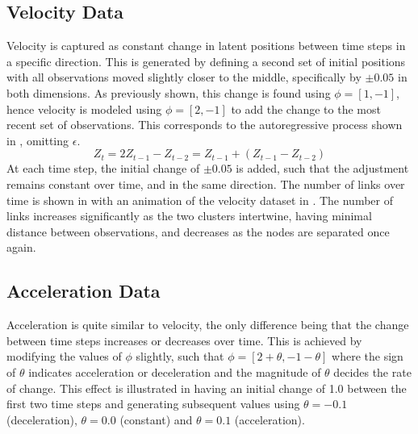     \subsection{Velocity Data}
        
        Velocity is captured as constant change in latent positions between time steps in a specific direction. This is generated by defining a second set of initial positions with all observations moved slightly closer to the middle, specifically by $\pm0.05$ in both dimensions. As previously shown, this change is found using $\phi=[1,-1]$, hence velocity is modeled using $\phi=[2,-1]$ to add the change to the most recent set of observations. This corresponds to the autoregressive process shown in , omitting $\epsilon$.
        \begin{equation}\label{eq:data-velocity}
            Z_t = 2 Z_{t-1} - Z_{t-2} = Z_{t-1} + (Z_{t-1} - Z_{t-2})
        \end{equation}
        At each time step, the initial change of $\pm0.05$ is added, such that the adjustment remains constant over time, and in the same direction. The number of links over time is shown in  with an animation of the velocity dataset in .
        The number of links increases significantly as the two clusters intertwine, having minimal distance between observations, and decreases as the nodes are separated once again.
        
    \subsection{Acceleration Data}
    
        Acceleration is quite similar to velocity, the only difference being that the change between time steps increases or decreases over time. This is achieved by modifying the values of $\phi$ slightly, such that $\phi=[2+\theta,-1-\theta]$ where the sign of $\theta$ indicates acceleration or deceleration and the magnitude of $\theta$ decides the rate of change. This effect is illustrated in  having an initial change of 1.0 between the first two time steps and generating subsequent values using $\theta=-0.1$ (deceleration), $\theta=0.0$ (constant) and $\theta=0.1$ (acceleration).
        
